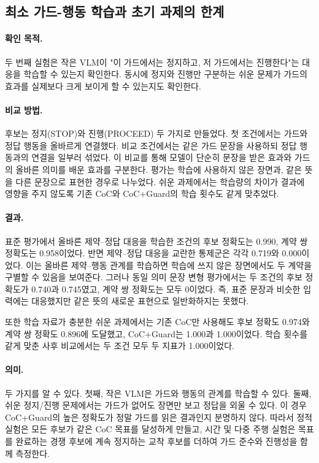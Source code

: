 \subsection{최소 가드-행동 학습과 초기 과제의 한계}

\paragraph{확인 목적.}
두 번째 실험은 작은 VLM이 "이 가드에서는 정지하고, 저 가드에서는 진행한다"는 대응을 학습할 수 있는지 확인한다. 동시에 정지와 진행만 구분하는 쉬운 문제가 가드의 효과를 실제보다 크게 보이게 할 수 있는지도 확인한다.

\paragraph{비교 방법.}
후보는 정지(STOP)와 진행(PROCEED) 두 가지로 만들었다. 첫 조건에서는 가드와 정답 행동을 올바르게 연결했다. 비교 조건에서는 같은 가드 문장을 사용하되 정답 행동과의 연결을 일부러 섞었다. 이 비교를 통해 모델이 단순히 문장을 받은 효과와 가드의 올바른 의미를 배운 효과를 구분한다. 평가는 학습에 사용하지 않은 장면과, 같은 뜻을 다른 문장으로 표현한 경우로 나누었다. 쉬운 과제에서는 학습량의 차이가 결과에 영향을 주지 않도록 기존 CoC와 CoC+Guard의 학습 횟수도 같게 맞추었다.

\paragraph{결과.}
표준 평가에서 올바른 제약--정답 대응을 학습한 조건의 후보 정확도는 0.990, 계약 쌍 정확도는 0.958이었다. 반면 제약--정답 대응을 교란한 통제군은 각각 0.719와 0.000이었다. 이는 올바른 제약--행동 관계를 학습하면 학습에 쓰지 않은 장면에서도 두 계약을 구별할 수 있음을 보여준다. 그러나 동일 의미 문장 변형 평가에서는 두 조건의 후보 정확도가 0.740과 0.745였고, 계약 쌍 정확도는 모두 0이었다. 즉, 표준 문장과 비슷한 입력에는 대응했지만 같은 뜻의 새로운 표현으로 일반화하지는 못했다.

또한 학습 자료가 충분한 쉬운 과제에서는 기존 CoC만 사용해도 후보 정확도 0.974와 계약 쌍 정확도 0.896에 도달했고, CoC+Guard는 1.000과 1.000이었다. 학습 횟수를 같게 맞춘 사후 비교에서는 두 조건 모두 두 지표가 1.000이었다.

\paragraph{의미.}
두 가지를 알 수 있다. 첫째, 작은 VLM은 가드와 행동의 관계를 학습할 수 있다. 둘째, 쉬운 정지/진행 문제에서는 가드가 없어도 장면만 보고 정답을 외울 수 있다. 이 경우 CoC+Guard의 높은 정확도가 정말 가드를 읽은 결과인지 분명하지 않다. 따라서 정적 실험은 모든 후보가 같은 CoC 목표를 달성하게 만들고, 시간 및 다중 주행 실험은 목표를 완료하는 경쟁 후보에 계속 정지하는 교착 후보를 더하여 가드 준수와 진행성을 함께 측정한다.

